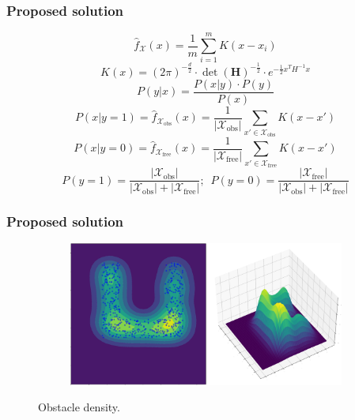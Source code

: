 \documentclass{beamer}
\begin{document}
\begin{frame}
	\frametitle{Proposed solution}	 
	\[ \hat{f}_\mathcal{X}(x) = \frac{1}{m} \sum_{i=1}^{m} K \left( x - x_{i} \right)\]
	\[K(x) = (2\pi)^{-\frac{d}{2}} \cdot \det(\textbf{H})^{-\frac{1}{2}} \cdot e^{-\frac{1}{2} x^T H^{-1} x}
\] 
\[
  P(y|x) = \frac{P(x|y) \cdot P(y)}{P(x)}
\] 
\[ P(x|y=1) = \hat{f}_{\mathcal{X}_{\text{obs}}}(x) = \frac{1}{|\mathcal{X}_{\text{obs}}|} \sum_{x' \in \mathcal{X}_{\text{obs}}} K \left( x - x' \right) \]
\[ P(x|y=0) = \hat{f}_{\mathcal{X}_{\text{free}}}(x) = \frac{1}{|\mathcal{X}_{\text{free}}|} \sum_{x' \in \mathcal{X}_{\text{free}}} K \left( x - x' \right) \]
\[ P(y=1) = \frac{|\mathcal{X}_{\text{obs}}|}{|\mathcal{X}_{\text{obs}}|+|\mathcal{X}_{\text{free}}|};\enspace
P(y=0) = \frac{|\mathcal{X}_{\text{free}}|}{|\mathcal{X}_{\text{obs}}|+|\mathcal{X}_{\text{free}}|}\]
\end{frame}	


\begin{frame}
	\frametitle{Proposed solution}	
	\begin{figure}[!ht]
		\centering 
		\begin{subfigure}[b]{1\textwidth}
			\includegraphics[width=\textwidth]{figChap4/GKDE_obsU.pdf} 
		\end{subfigure}   
		\caption{Obstacle density.} 
	  \end{figure}
\end{frame}	
\end{document}
